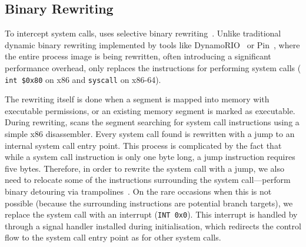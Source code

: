 \subsection{Binary Rewriting}
\label{sec:rewriting}


To intercept system calls, \varan uses selective binary
rewriting~\cite{bird}. Unlike traditional dynamic binary rewriting
implemented by tools like DynamoRIO~\cite{dynamorio02} or
Pin~\cite{pin05}, where the entire process image is being rewritten,
often introducing a significant performance overhead, \varan only
replaces the instructions for performing system calls (\ie
\lstinline[language={[x64]Assembler}]`int $0x80` on x86 and
\lstinline[language={[x64]Assembler}]`syscall` on x86-64).

The rewriting itself is done when a segment is mapped into memory with
executable permissions, or an existing memory segment is marked as
executable.  
During rewriting, \varan scans the segment searching for system call
instructions using a simple x86 disassembler.  Every system call found
is rewritten with a jump to an internal system call entry point. This
process is complicated by the fact that while a system call
instruction is only one byte long, a jump instruction requires five
bytes.  Therefore, in order to rewrite the system call with a jump, we
also need to relocate some of the instructions surrounding the system
call---\ie perform binary detouring via trampolines~\cite{detours}.
On the rare occasions when this is not possible (\eg because the
surrounding instructions are potential branch targets), we replace the
system call with an interrupt (\lstinline`INT 0x0`).  This interrupt
is handled by \varan through a signal handler installed during
initialisation, which redirects the control flow to the system call
entry point as for other system calls.

